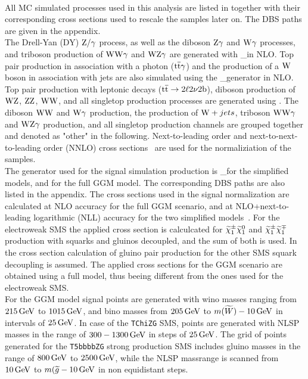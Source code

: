 \\
All MC simulated processes used in this analysis are listed in  together with their corresponding cross sections used to rescale the samples later on. The DBS paths are given in the appendix.\\
The Drell-Yan (DY) $\mathrm{Z}/\gamma$ process, as well as the diboson $\mathrm{Z}\gamma$ and $\mathrm{W}\gamma$ processes, and triboson production of $\mathrm{W}\mathrm{W}\gamma$ and $\mathrm{W}\mathrm{Z}\gamma$ are generated with \MADGRAPH\_\MCATNLO in NLO. Top pair production in association with a photon (${\mathrm{t}\overline{\mathrm{t}}}\gamma$) and the production of a $\mathrm{W}$ boson in association with jets are also simulated using the \MADGRAPH\_\MCATNLO generator in NLO. Top pair production with leptonic decays (${\mathrm{t}\overline{\mathrm{t}}}\to 2\ell 2\nu 2\mathrm{b}$), diboson production of $\mathrm{W}\mathrm{Z}$, $\mathrm{Z}\mathrm{Z}$, $\mathrm{W}\mathrm{W}$, and all singletop production processes are generated using \POWHEG.
The diboson $\mathrm{W}\mathrm{W}$ and $\mathrm{W}\gamma$ production, the production of $\mathrm{W}+jets$, triboson $\mathrm{W}\mathrm{W}\gamma$ and $\mathrm{W}\mathrm{Z}\gamma$ production, and all singletop production channels are grouped together and denoted as "other" in the following.
Next-to-leading order and next-to-next-to-leading order (NNLO) cross sections~\cite{xsec1,xsec2,xsec3,xsec4,xsec5,xsec6,xsec7,xsec8,xsec9} are used for the normaliziation of the samples.\\
The generator used for the signal simulation production is \MADGRAPH\_\MCATNLO for the simplified models, and  for the full GGM model. The corresponding DBS paths are also listed in the appendix.
The cross sections used in the signal normalization are calculated at NLO accuracy for the full GGM scenario, and at NLO+next-to-leading logarithmic (NLL) accuracy for the two simplified models~\cite{sxsec1,sxsec2,sxsec3,sxsec4,sxsec5,sxsec6,sxsec7,sxsec8,sxsec9}.
For the electroweak SMS the applied cross section is calculcated for $\widetilde{\chi}^\pm_{1}\widetilde{\chi}^{0}_{1}$ and $\widetilde{\chi}^\pm_{1}\widetilde{\chi}^\mp_{1}$ production with squarks and gluinos decoupled, and the sum of both is used. In the cross section calculation of gluino pair production for the other SMS squark decoupling is assumed. The applied cross sections for the GGM scenario are obtained using a full model, thus beeing different from the ones used for the electroweak SMS.\\
For the GGM model signal points are generated with wino masses ranging from $215\,\text{Ge\hspace{-.08em}V}$ to $1015\,\text{Ge\hspace{-.08em}V}$, and bino masses from $205\,\text{Ge\hspace{-.08em}V}$ to $m(\widetilde{W})-10\,\text{Ge\hspace{-.08em}V}$ in intervals of $25\,\text{Ge\hspace{-.08em}V}$.
In case of the \texttt{TChiZG} SMS, points are generated with NLSP masses in the range of $300-1300\,\text{Ge\hspace{-.08em}V}$ in steps of $25\,\text{Ge\hspace{-.08em}V}$. The grid of points generated for the \texttt{T5bbbbZG} strong production SMS includes gluino masses in the range of $800\,\text{Ge\hspace{-.08em}V}$ to $2500\,\text{Ge\hspace{-.08em}V}$, while the NLSP massrange is scanned from $10\,\text{Ge\hspace{-.08em}V}$ to $m(\widetilde{g}-10\,\text{Ge\hspace{-.08em}V}$ in non equidistant steps.\\
